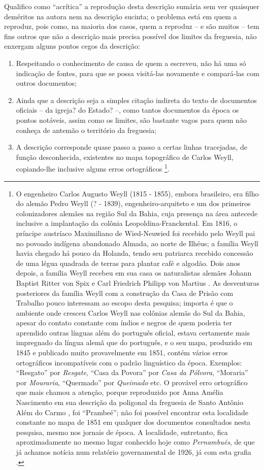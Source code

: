Qualifico como ``acrítica'' a reprodução desta descrição sumária sem ver quaisquer deméritos na autora nem na descrição sucinta; o problema está em quem a reproduz, pois como, na maioria dos casos, quem a reproduz -- e são muitos -- tem fins outros que não a descrição mais precisa possível dos limites da freguesia, não enxergam alguns pontos cegos da descrição:
\begin{enumerate}
\item Respeitando o conhecimento de causa de quem a escreveu, não há uma só indicação de fontes, para que se possa visitá-las novamente e compará-las com outros documentos;
\item Ainda que a descrição seja a simples citação indireta do texto de documentos oficiais -- da igreja? do Estado? --, como tantos documentos da época os pontos notáveis, assim como os limites, são bastante vagos para quem não conheça de antemão o território da freguesia;
\item A descrição corresponde quase passo a passo a certas linhas tracejadas, de função desconhecida, existentes no mapa topográfico de Carlos Weyll, copiando-lhe inclusive alguns erros ortográficos \cite{weyll_mappa_1851}\footnote{O engenheiro Carlos Augusto Weyll (1815 - 1855), embora brasileiro, era filho do alemão Pedro Weyll (? - 1839), engenheiro-arquiteto e um dos primeiros colonizadores alemães na região Sul da Bahia, cuja presença na área antecede inclusive a implantação da colônia Leopoldina-Franckental. Em 1816, o príncipe austríaco Maximiliano de Wied-Neuwied foi recebido pelo Weyll pai no povoado indígena abandonado Almada, ao norte de Ilhéus; a família Weyll havia chegado há pouco da Holanda, tendo seu patriarca recebido concessão de uma légua quadrada de terras para plantar café e algodão. Dois anos depois, a família Weyll recebeu em sua casa os naturalistas alemães Johann Baptist Ritter von Spix e Carl Friedrich Philipp von Martius \cite[pp.~458-460]{oberacker_leopoldina_1972}. As desventuras posteriores da família Weyll com a construção da Casa de Prisão com Trabalho pouco interessam ao escopo desta pesquisa; importa é que o ambiente onde cresceu Carlos Weyll nas colônias alemãs do Sul da Bahia, apesar do contato constante com índios e negros de quem poderia ter aprendido outras línguas além do português oficial, estava certamente mais impregnado da língua alemã que do português, e o seu mapa, produzido em 1845 \cite[p.~31]{bahia_rpe_1846} e publicado muito provavelmente em 1851, contém vários erros ortográficos incompatíveis com o padrão linguístico da época. Exemplos: ``Resgato'' por \textit{Resgate}, ``Casa da Povora'' por \textit{Casa da Pólvora}, ``Moraria'' por \textit{Mouraria}, ``Quermado'' por \textit{Queimado} etc. O provável erro ortográfico que mais chamou a atenção, porque reproduzido por Anna Amélia Nascimento em sua descrição da poligonal da freguesia de Santo Antônio Além do Carmo \cite[p.~55]{NASCIMENTO2007}, foi ``Prambeé''; não foi possível encontrar esta localidade constante no mapa de 1851 em qualquer dos documentos consultados nesta pesquisa, mesmo nos jornais de época. A localidade, entretanto, fica aproximadamente no mesmo lugar conhecido hoje como \textit{Pernambués}, de que já achamos notícia num relatório governamental de 1926, já com esta grafia \cite[p.~185]{bahia_rpe_1926}.}.

\end{enumerate}
